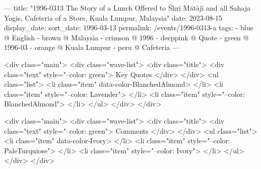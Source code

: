 ---
title: "1996-0313 The Story of a Lunch Offered to Śhrī Mātājī and all Sahaja Yogis, Cafeteria of a Store, Kuala Lumpur, Malaysia"
date: 2023-08-15
display_date: 
sort_date: 1996-03-13
permalink: /events/1996-0313-a
tags:
  - blue @ English
  - brown @ Malaysia
  - crimson @ 1996
  - deeppink @ Quote
  - green @ 1996-03
  - orange @ Kuala Lumpur
  - peru @ Cafeteria
---

<div class="main">
  <div class="wave-list">
    <div class="title">
      <div class="text" style="--color: green">
        Key Quotes
      </div>
    </div>
    <ul class="list">
        <li class="item" data-color-BlanchedAlmond>
        </li>
        <li class="item" style="--color: Lavender">
        </li>
        <li class="item" style="--color: BlanchedAlmond">
        </li>
      </ul>
  </div>
</div>

<div class="main">
  <div class="wave-list">
    <div class="title">
      <div class="text" style="--color: green">
        Comments
      </div>
    </div>
    <ul class="list">
        <li class="item" data-color-Ivory>
        </li>
        <li class="item" style="--color: PaleTurquiose">
        </li>
        <li class="item" style="--color: Ivory">
        </li>
      </ul>
  </div>
</div>